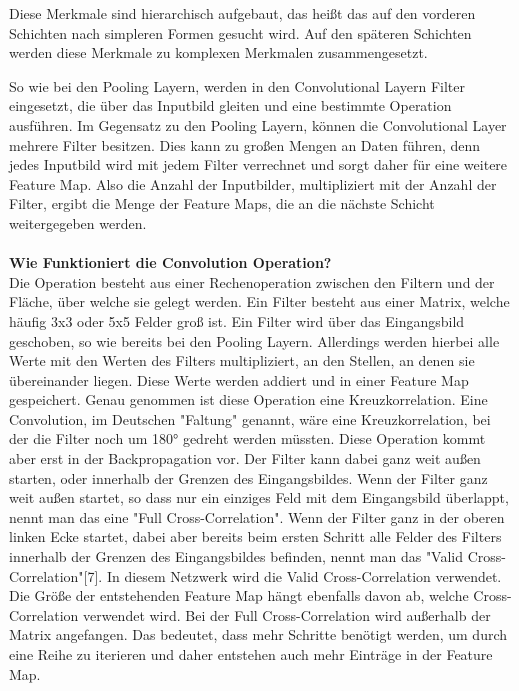 \documentclass[12pt]{article}
\begin{document}
Diese Merkmale sind hierarchisch aufgebaut, das heißt das auf den vorderen Schichten nach simpleren Formen gesucht wird. Auf den späteren Schichten werden diese Merkmale zu komplexen Merkmalen zusammengesetzt.

So wie bei den Pooling Layern, werden in den Convolutional Layern Filter eingesetzt, die über das Inputbild gleiten und eine bestimmte Operation ausführen. Im Gegensatz zu den Pooling Layern, können die Convolutional Layer mehrere Filter besitzen. Dies kann zu großen Mengen an Daten führen, denn jedes Inputbild wird mit jedem Filter verrechnet und sorgt daher für eine weitere Feature Map. Also die Anzahl der Inputbilder, multipliziert mit der Anzahl der Filter, ergibt die Menge der Feature Maps, die an die nächste Schicht weitergegeben werden.
\\
\\
\textbf{Wie Funktioniert die Convolution Operation?}\\
Die Operation besteht aus einer Rechenoperation zwischen den Filtern und der Fläche, über welche sie gelegt werden. Ein Filter besteht aus einer Matrix, welche häufig 3x3 oder 5x5 Felder groß ist. 
Ein Filter wird über das Eingangsbild geschoben, so wie bereits bei den Pooling Layern. Allerdings werden hierbei alle Werte mit den Werten des Filters multipliziert, an den Stellen, an denen sie übereinander liegen. Diese Werte werden addiert und in einer Feature Map gespeichert.
Genau genommen ist diese Operation eine Kreuzkorrelation. Eine Convolution, im Deutschen "Faltung" genannt, wäre eine Kreuzkorrelation, bei der die Filter noch um 180° gedreht werden müssten. Diese Operation kommt aber erst in der Backpropagation vor.
Der Filter kann dabei ganz weit außen starten, oder innerhalb der Grenzen des Eingangsbildes. Wenn der Filter ganz weit außen startet, so dass nur ein einziges Feld mit dem Eingangsbild überlappt, nennt man das eine "Full Cross-Correlation". Wenn der Filter ganz in der oberen linken Ecke startet, dabei aber bereits beim ersten Schritt alle Felder des Filters innerhalb der Grenzen des Eingangsbildes befinden, nennt man das "Valid Cross-Correlation"[7].
In diesem Netzwerk wird die Valid Cross-Correlation verwendet. Die Größe der entstehenden Feature Map hängt ebenfalls davon ab, welche Cross-Correlation verwendet wird. 
Bei der Full Cross-Correlation wird außerhalb der Matrix angefangen. Das bedeutet, dass mehr Schritte benötigt werden, um durch eine Reihe zu iterieren und daher entstehen auch mehr Einträge in der Feature Map.
\end{document}
